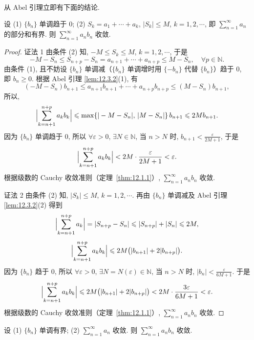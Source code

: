 从 Abel 引理立即有下面的结论.

\begin{theorem}\label{thm:12.3.2}
设
(1) $\{b_{n}\}$ 单调趋于 $0$;
(2) $S_{k}=a_{1}+\cdots+a_{k}$, $|S_{k}|\leqslant M$, $k=1,2,\cdots$, 即 $\sum_{n=1}^{\infty}a_{n}$ 的部分和有界.
则 $\sum_{n=1}^{\infty}a_{n}b_{n}$ 收敛.
\end{theorem}

\begin{proof}
证法 1 由条件 (2) 知, $-M\leqslant S_{k}\leqslant M$, $k=1,2,\cdots$, 于是
\[
  -M-S_{n}\leqslant S_{n+p}-S_{n}=a_{n+1}+\cdots+a_{n+p}\leqslant M-S_{n},
  \quad\forall p\in\mathbb{N}.
\]
由条件 (1), 且不妨设 $\{b_{n}\}$ 单调减（$\{b_{n}\}$ 单调增时用 $\{-b_{n}\}$ 代替 $\{b_{n}\}$）趋于 $0$, 即 $b_{n}\geqslant0$. 根据 Abel 引理 \ref{lem:12.3.2}(1), 有
\[
  (-M-S_{n})b_{n+1}\leqslant a_{n+1}b_{n+1}+\cdots+a_{n+p}b_{n+p}\leqslant(M-S_{n})b_{n+1},
\]
所以,
\[
  \Bigl|\sum_{k=n+1}^{n+p}a_{k}b_{k}\Bigr|
  \leqslant\max\{|-M-S_{n}|,\,|M-S_{n}|\}\,b_{n+1}\leqslant 2Mb_{n+1}.
\]
因为 $\{b_{n}\}$ 单调趋于 $0$, 所以 $\forall\varepsilon>0$, $\exists N\in\mathbb{N}$, 当 $n>N$ 时, $b_{n+1}<\frac{\varepsilon}{2M+1}$, 于是
\[
  \Bigl|\sum_{k=n+1}^{n+p}a_{k}b_{k}\Bigr|<2M\cdot\frac{\varepsilon}{2M+1}<\varepsilon.
\]
根据级数的 Cauchy 收敛准则（定理~\ref{thm:12.1.1}）, $\sum_{n=1}^{\infty}a_{n}b_{n}$ 收敛.

证法 2 由条件 (2) 知, $|S_{k}|\leqslant M$, $k=1,2,\cdots$. 再由 $\{b_{n}\}$ 单调减及 Abel 引理 \ref{lem:12.3.2}(2) 得到
\[
  \Bigl|\sum_{k=n+1}^{n+p}a_{k}\Bigr|=|S_{n+p}-S_{n}|\leqslant|S_{n+p}|+|S_{n}|\leqslant 2M,
\]
\[
  \Bigl|\sum_{k=n+1}^{n+p}a_{k}b_{k}\Bigr|\leqslant 2M\bigl(|b_{n+1}|+2|b_{n+p}|\bigr).
\]
因为 $\{b_{n}\}$ 趋于 $0$, 所以 $\forall\varepsilon>0$, $\exists N=N(\varepsilon)\in\mathbb{N}$, 当 $n>N$ 时, $|b_{n}|<\frac{\varepsilon}{6M+1}$. 于是
\[
  \Bigl|\sum_{k=n+1}^{n+p}a_{k}b_{k}\Bigr|
  \leqslant 2M\bigl(|b_{n+1}|+2|b_{n+p}|\bigr)
  <2M\cdot\frac{3\varepsilon}{6M+1}<\varepsilon.
\]
根据级数的 Cauchy 收敛准则（定理~\ref{thm:12.1.1}）, $\sum_{n=1}^{\infty}a_{n}b_{n}$ 收敛.
\end{proof}

\begin{theorem}\label{thm:12.3.3}
设
(1) $\{b_{n}\}$ 单调有界;
(2) $\sum_{n=1}^{\infty}a_{n}$ 收敛.
则 $\sum_{n=1}^{\infty}a_{n}b_{n}$ 收敛.
\end{theorem}

